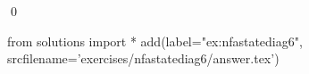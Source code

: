 
\begin{ex} 
  \label{ex:nfastatediag6}
  
  \qed
\end{ex} 
\begin{python0}
from solutions import *
add(label="ex:nfastatediag6",
    srcfilename='exercises/nfastatediag6/answer.tex') 
\end{python0}
